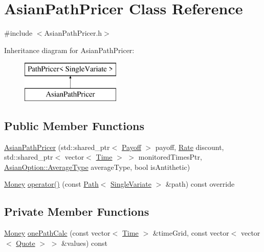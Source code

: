 \hypertarget{class_asian_path_pricer}{}\section{Asian\+Path\+Pricer Class Reference}
\label{class_asian_path_pricer}


{\ttfamily \#include $<$Asian\+Path\+Pricer.\+h$>$}

Inheritance diagram for Asian\+Path\+Pricer\+:\begin{figure}[H]
\begin{center}
\leavevmode
\includegraphics[height=2.000000cm]{class_asian_path_pricer}
\end{center}
\end{figure}
\subsection*{Public Member Functions}
\begin{DoxyCompactItemize}
\item 
\hyperlink{class_asian_path_pricer_a8e295461d8e635e39d8075810bcc1e6a}{Asian\+Path\+Pricer} (std\+::shared\+\_\+ptr$<$ \hyperlink{class_payoff}{Payoff} $>$ payoff, \hyperlink{_name_def_8h_a25bee43a162de339c81f3d1caf6b887d}{Rate} discount, std\+::shared\+\_\+ptr$<$ vector$<$ \hyperlink{_name_def_8h_ac2d3e0ba793497bcca555c7c2cf64ff3}{Time} $>$ $>$ monitored\+Times\+Ptr, \hyperlink{class_asian_option_add7292791bf85820ff9fdbfd4407f3b9}{Asian\+Option\+::\+Average\+Type} average\+Type, bool is\+Antithetic)
\item 
\hyperlink{_name_def_8h_a5a9d48c16a694e9a2d9f1eca730dc8c5}{Money} \hyperlink{class_asian_path_pricer_a929e8a33447f977bfc947e1d5344e353}{operator()} (const \hyperlink{class_path}{Path}$<$ \hyperlink{struct_single_variate}{Single\+Variate} $>$ \&path) const override
\end{DoxyCompactItemize}
\subsection*{Private Member Functions}
\begin{DoxyCompactItemize}
\item 
\hyperlink{_name_def_8h_a5a9d48c16a694e9a2d9f1eca730dc8c5}{Money} \hyperlink{class_asian_path_pricer_a33d53acde0a8553f4adcee70c47f50b4}{one\+Path\+Calc} (const vector$<$ \hyperlink{_name_def_8h_ac2d3e0ba793497bcca555c7c2cf64ff3}{Time} $>$ \&time\+Grid, const vector$<$ vector$<$ \hyperlink{_name_def_8h_a642a6c5fd87319d922637de0e0bb0305}{Quote} $>$ $>$ \&values) const
\end{DoxyCompactItemize}
